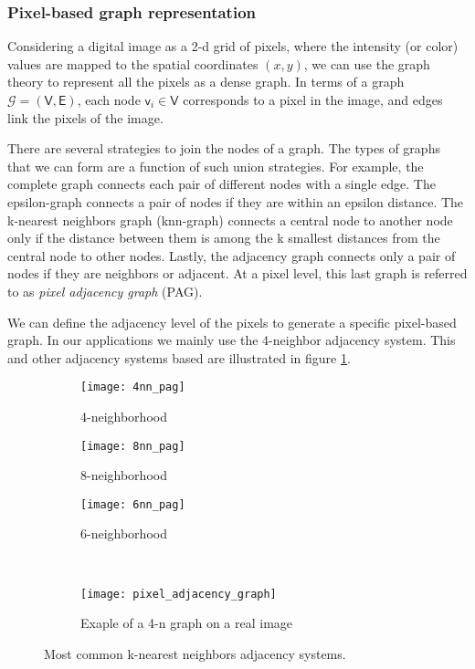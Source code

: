 
\subsubsection{Pixel-based graph representation}

Considering a digital image as a 2-d grid of pixels, where the intensity (or color) values are mapped to the spatial coordinates $(x, y)$, we can use the graph theory to represent all the pixels as a dense graph. In terms of a graph $\mathcal{G}=(\mathsf{V}, \mathsf{E})$, each node $\mathsf{v}_i \in \mathsf{V}$ corresponds to a pixel in the image, and edges link the pixels of the image. 

There are several strategies to join the nodes of a graph. The types of graphs that we can form are a function of such union strategies. For example, the complete graph connects each pair of different nodes with a single edge. The epsilon-graph connects a pair of nodes if they are within an epsilon distance. The k-nearest neighbors graph (knn-graph) connects a central node to another node only if the distance between them is among the k smallest distances from the central node to other nodes. Lastly, the adjacency graph connects only a pair of nodes if they are neighbors or adjacent. At a pixel level, this last graph is referred to as \textit{pixel adjacency graph} (PAG).

We can define the adjacency level of the pixels to generate a specific pixel-based graph. In our applications we mainly use the 4-neighbor adjacency system. This and other adjacency systems based are illustrated in figure \ref{fig:pixel_adjacency_graph}.


\begin{figure}[!ht]
    \centering

	\begin{subfigure}[b]{0.2\textwidth}
    	\texttt{[image: 4nn\_pag]}
        \caption{ 4-neighborhood}
    \end{subfigure}\qquad   
    \begin{subfigure}[b]{0.2\textwidth}
    	\texttt{[image: 8nn\_pag]}
        \caption{8-neighborhood}
    \end{subfigure}\qquad
    \begin{subfigure}[b]{0.23\textwidth}
    	\texttt{[image: 6nn\_pag]}
        \caption{6-neighborhood}
    \end{subfigure}\\[5ex]    
    \begin{subfigure}[b]{0.5\textwidth}
        \texttt{[image: pixel\_adjacency\_graph]}
        \caption{Exaple of a 4-n graph on a real image}
    \end{subfigure}         
        	    
    \caption{Most common k-nearest neighbors adjacency systems.}\label{fig:pixel_adjacency_graph}    
\end{figure}

